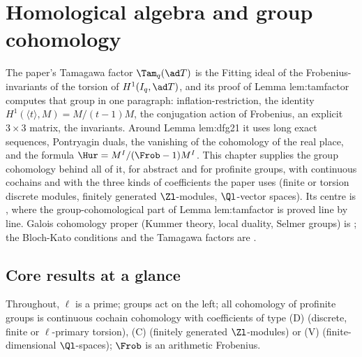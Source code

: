 \chapter{Homological algebra and group cohomology}\label{ch:cohomology}

The paper's Tamagawa factor $\Tam_q(\ad T)$ is the Fitting ideal of the Frobenius-invariants of the torsion of $H^1(I_q,\ad T)$, and its proof of Lemma
lem:tamfactor computes that group in one paragraph: inflation-restriction, the identity $H^1(\langle t\rangle,M)=M/(t-1)M$, the conjugation action of Frobenius,
an explicit $3\times3$ matrix, the invariants. Around Lemma lem:dfg21 it uses long exact sequences, Pontryagin duals, the vanishing of the cohomology of the real
place, and the formula $\Hur=M^{I}/(\Frob-1)M^I$. This chapter supplies the group cohomology behind all of it, for abstract and for profinite groups, with
continuous cochains and with the three kinds of coefficients the paper uses (finite or torsion discrete modules, finitely generated $\Zl$-modules, $\Ql$-vector
spaces). Its centre is , where the group-cohomological part of Lemma lem:tamfactor is proved line by line. Galois cohomology proper
(Kummer theory, local duality, Selmer groups) is ; the Bloch-Kato conditions and the Tamagawa factors are .

\section*{Core results at a glance}

Throughout, $\ell$ is a prime; groups act on the left; all cohomology of profinite groups is continuous cochain cohomology with coefficients of type (D) (discrete,
finite or $\ell$-primary torsion), (C) (finitely generated $\Zl$-modules) or (V) (finite-dimensional $\Ql$-spaces); $\Frob$ is an arithmetic Frobenius.

